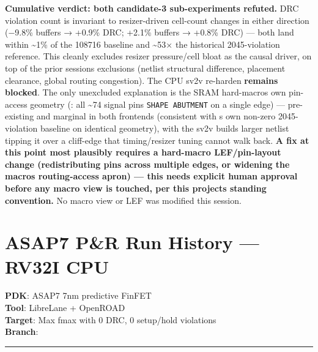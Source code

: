 \begin{record}
\textbf{Cumulative verdict: both candidate-3 sub-experiments refuted.}
DRC violation count is invariant to resizer-driven cell-count changes in
either direction (−9.8\% buffers → +0.9\% DRC; +2.1\% buffers → +0.8\%
DRC) --- both land within \textasciitilde1\% of the 108716 baseline and
\textasciitilde53× the historical 2045-violation reference. This cleanly
excludes resizer pressure/\allowbreak{}cell bloat as the causal driver,
on top of the prior session\textquotesingle s exclusions (netlist
structural difference, placement clearance, global routing congestion).
The CPU sv2v re-harden \textbf{remains blocked}. The only unexcluded
explanation is the SRAM hard-macro\textquotesingle s own pin-access
geometry (: all \textasciitilde74 signal
pins \texttt{SHAPE\ ABUTMENT} on a single edge) --- pre-existing and
marginal in both frontends (consistent with \textquotesingle s
own non-zero 2045-violation baseline on identical geometry), with the
sv2v build\textquotesingle s larger netlist tipping it over a cliff-edge
that timing/\allowbreak{}resizer tuning cannot walk back. \textbf{A fix
at this point most plausibly requires a hard-macro
LEF/\allowbreak{}pin-layout change (redistributing pins across multiple
edges, or widening the macro\textquotesingle s routing-access apron) ---
this needs explicit human approval before any macro view is touched, per
this project\textquotesingle s standing convention.} No macro view or
LEF was modified this session.

\end{record}

\section{ASAP7 P\&R Run History --- RV32I CPU}\label{cr:run:asap7-cpu}

\begin{record}

\textbf{PDK}: ASAP7 7nm predictive FinFET\\
\textbf{Tool}: LibreLane + OpenROAD\\
\textbf{Target}: Max fmax with 0 DRC, 0 setup/\allowbreak{}hold
violations\\
\textbf{Branch}: 

\begin{center}\rule{0.5\linewidth}{0.5pt}\end{center}

\end{record}

